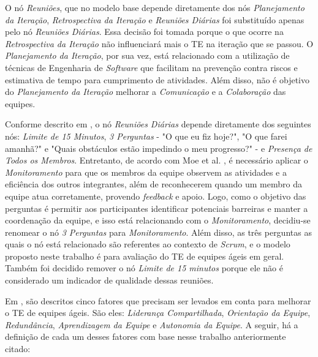 O nó \textit{Reuniões}, que no modelo base depende diretamente dos nós \textit{Planejamento da Iteração}, \textit{Retrospectiva da Iteração} e \textit{Reuniões Diárias} foi substituído apenas pelo nó \textit{Reuniões Diárias}. Essa decisão foi tomada porque o que ocorre na \textit{Retrospectiva da Iteração} não influenciará mais o TE na iteração que se passou. O \textit{Planejamento da Iteração}, por sua vez, está relacionado com a utilização de técnicas de Engenharia de \textit{Software} que facilitam na prevenção contra riscos e estimativa de tempo para cumprimento de atividades. Além disso, não é objetivo do \textit{Planejamento da Iteração} melhorar a \textit{Comunicação} e a \textit{Colaboração} das equipes.

Conforme descrito em \cite{freire}, o nó \textit{Reuniões Diárias} depende diretamente dos seguintes nós: \textit{Limite de 15 Minutos}, \textit{3 Perguntas} - "O que eu fiz hoje?", "O que farei amanhã?" e "Quais obstáculos estão impedindo o meu progresso?" - e \textit{Presença de Todos os Membros}. Entretanto, de acordo com Moe et al. \cite{moe2}, é necessário aplicar o \textit{Monitoramento} para que os membros da equipe observem as atividades e a eficiência dos outros integrantes, além de reconhecerem quando um membro da equipe atua corretamente, provendo \textit{feedback} e apoio. Logo, como o objetivo das perguntas é permitir aos participantes identificar potenciais barreiras e manter a coordenação da equipe, e isso está relacionando com o \textit{Monitoramento}, decidiu-se renomear o nó \textit{3 Perguntas} para \textit{Monitoramento}. Além disso, as três perguntas as quais o nó está relacionado são referentes ao contexto de \textit{Scrum}, e o modelo proposto neste trabalho é para avaliação do TE de equipes ágeis em geral. Também foi decidido remover o nó \textit{Limite de 15 minutos} porque ele não é considerado um indicador de qualidade dessas reuniões.

Em \cite{moe}, são descritos cinco fatores que precisam ser levados em conta para melhorar o TE de equipes ágeis. São eles: \textit{Liderança Compartilhada}, \textit{Orientação da Equipe}, \textit{Redundância}, \textit{Aprendizagem da Equipe} e \textit{Autonomia da Equipe}. A seguir, há a definição de cada um desses fatores com base nesse trabalho anteriormente citado:

